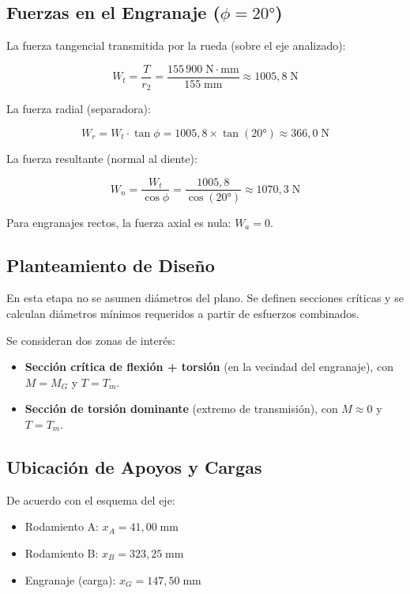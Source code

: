 \documentclass[conference]{IEEEtran}
\begin{document}
\subsection{Fuerzas en el Engranaje ($\phi = 20°$)}

La fuerza tangencial transmitida por la rueda (sobre el eje analizado):

\begin{equation}
W_t = \frac{T}{r_2} = \frac{155\,900\;\mathrm{N{\cdot}mm}}{155\;\mathrm{mm}}
    \approx 1005{,}8\;\mathrm{N}
\end{equation}

La fuerza radial (separadora):

\begin{equation}
W_r = W_t \cdot \tan\phi = 1005{,}8 \times \tan(20°) \approx 366{,}0\;\mathrm{N}
\end{equation}

La fuerza resultante (normal al diente):

\begin{equation}
W_n = \frac{W_t}{\cos\phi} = \frac{1005{,}8}{\cos(20°)} \approx 1070{,}3\;\mathrm{N}
\end{equation}

Para engranajes rectos, la fuerza axial es nula: $W_a = 0$.

\subsection{Planteamiento de Diseño}

En esta etapa no se asumen diámetros del plano. Se definen secciones críticas y se
calculan diámetros mínimos requeridos a partir de esfuerzos combinados.

Se consideran dos zonas de interés:
\begin{itemize}
  \item \textbf{Sección crítica de flexión + torsión} (en la vecindad del engranaje),
  con $M = M_G$ y $T = T_m$.
  \item \textbf{Sección de torsión dominante} (extremo de transmisión), con
  $M \approx 0$ y $T = T_m$.
\end{itemize}

\subsection{Ubicación de Apoyos y Cargas}

De acuerdo con el esquema del eje:

\begin{itemize}
  \item Rodamiento A: $x_A = 41{,}00\;\mathrm{mm}$
  \item Rodamiento B: $x_B = 323{,}25\;\mathrm{mm}$
  \item Engranaje (carga): $x_G = 147{,}50\;\mathrm{mm}$
\end{itemize}
\end{document}
